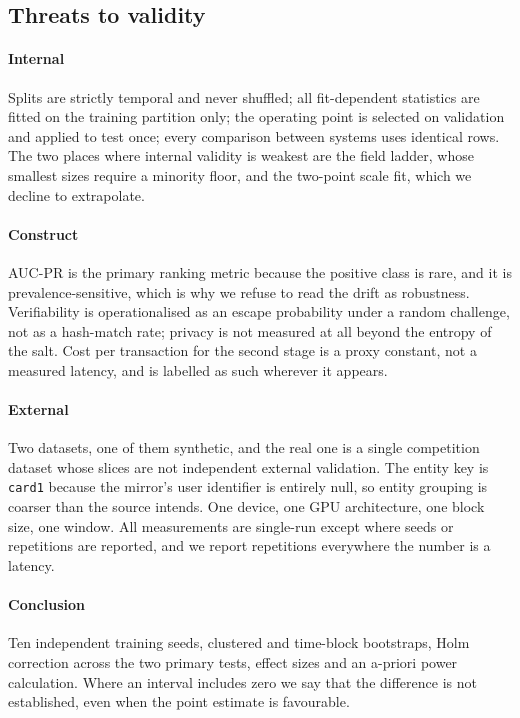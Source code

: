 \subsection{Threats to validity}

\paragraph{Internal} Splits are strictly temporal and never shuffled; all
fit-dependent statistics are fitted on the training partition only; the operating
point is selected on validation and applied to test once; every comparison between
systems uses identical rows. The two places where internal validity is weakest are
the field ladder, whose smallest sizes require a minority floor, and the
two-point scale fit, which we decline to extrapolate.

\paragraph{Construct} AUC-PR is the primary ranking metric because the positive
class is rare, and it is prevalence-sensitive, which is why we refuse to read the
\DatasetBaf{} drift as robustness. Verifiability is operationalised as an escape
probability under a random challenge, not as a hash-match rate; privacy is not
measured at all beyond the entropy of the salt. Cost per transaction for the second
stage is a proxy constant, not a measured latency, and is labelled as such wherever
it appears.

\paragraph{External} Two datasets, one of them synthetic, and the real one is a
single competition dataset whose slices are not independent external validation.
The entity key is \texttt{card1} because the mirror's user identifier is entirely
null, so entity grouping is coarser than the source intends. One device, one GPU
architecture, one block size, one window. All measurements are single-run except
where seeds or repetitions are reported, and we report repetitions everywhere the
number is a latency.

\paragraph{Conclusion} Ten independent training seeds, clustered and time-block
bootstraps, Holm correction across the two primary tests, effect sizes and an
a-priori power calculation. Where an interval includes zero we say that the
difference is not established, even when the point estimate is favourable.

